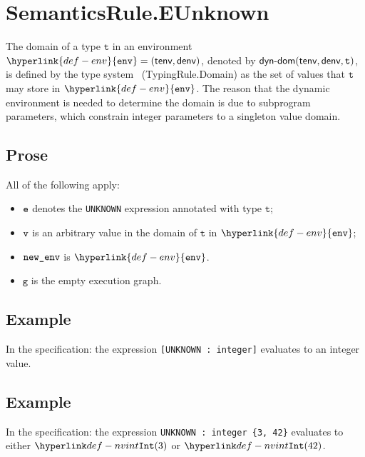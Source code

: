 \documentclass{book}
\newcommand\env[0]{\hyperlink{def-env}{\texttt{env}}}
\newcommand\vg[0]{\texttt{g}}
\newcommand\vt[0]{\texttt{t}}
\begin{document}

\section{SemanticsRule.EUnknown \label{sec:SemanticsRule.EUnknown}}
  \begin{definition}
  The domain of a type $\vt$ in an environment $\env=(\tenv,\denv)$,
  denoted by $\textsf{dyn-dom}(\tenv, \denv, \vt)$, is defined by the type system~\cite{ASLTypingReference}
  (TypingRule.Domain)
  as the set of values that $\vt$ may store in $\env$. The reason that the dynamic environment is
  needed to determine the domain is due to subprogram parameters, which constrain integer parameters to
  a singleton value domain.
  \end{definition}

  \subsection{Prose}
  All of the following apply:
  \begin{itemize}
  \item $\texttt{e}$ denotes the \texttt{UNKNOWN} expression annotated with type $\vt$;
  \item $\texttt{v}$ is an arbitrary value in the domain of $\vt$ in $\env$;
  \item $\texttt{new\_env}$ is $\env$.
  \item $\vg$ is the empty execution graph.
  \end{itemize}

  \subsection{Example}
    In the specification:
    the expression \texttt{[UNKNOWN : integer]} evaluates to an integer value.

\subsection{Example}
In the specification:
the expression \verb|UNKNOWN : integer {3, 42}| evaluates to either $\nvint(3)$ or $\nvint(42)$.
\end{document}
